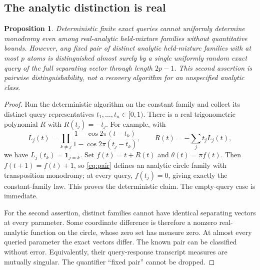 \documentclass[11pt]{article}
\newtheorem{proposition}[theorem]{Proposition}
\theoremstyle{remark}\newtheorem{remark}[theorem]{Remark}
\begin{document}
\subsection{The analytic distinction is real}
\begin{proposition}\label{prop:analytic}
Deterministic finite exact queries cannot uniformly determine monodromy even among real-analytic held-mixture families without quantitative bounds. However, any \emph{fixed pair} of distinct analytic held-mixture families with at most $p$ atoms is distinguished almost surely by a single uniformly random exact query of the full separating vector through length $2p-1$. This second assertion is pairwise distinguishability, not a recovery algorithm for an unspecified analytic class.
\end{proposition}
\begin{proof}
Run the deterministic algorithm on the constant family and collect its distinct query representatives $t_1,\ldots,t_n\in[0,1)$. There is a real trigonometric polynomial $R$ with $R(t_j)=-t_j$. For example, with
\[
 L_j(t)=\prod_{k\ne j}
 \frac{1-\cos 2\pi(t-t_k)}{1-\cos2\pi(t_j-t_k)},
 \qquad R(t)=-\sum_jt_jL_j(t),
\]
we have $L_j(t_k)=\mathbf1_{j=k}$. Set $f(t)=t+R(t)$ and $\theta(t)=\pi f(t)$. Then $f(t+1)=f(t)+1$, so \eqref{eq:pair} defines an analytic circle family with transposition monodromy; at every query, $f(t_j)=0$, giving exactly the constant-family law. This proves the deterministic claim. The empty-query case is immediate.

For the second assertion, distinct families cannot have identical separating vectors at every parameter. Some coordinate difference is therefore a nonzero real-analytic function on the circle, whose zero set has measure zero. At almost every queried parameter the exact vectors differ. The known pair can be classified without error. Equivalently, their query-response transcript measures are mutually singular. The quantifier ``fixed pair'' cannot be dropped.
\end{proof}
\end{document}
